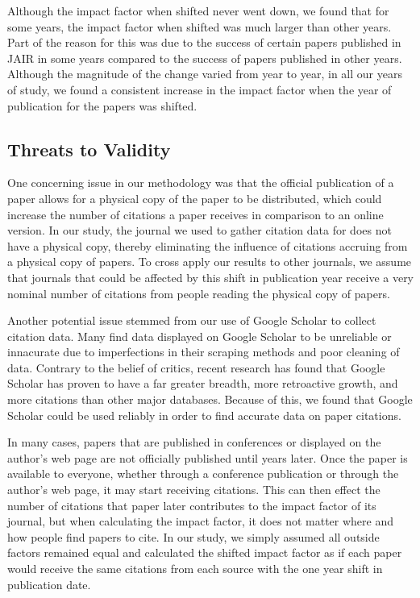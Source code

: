 \documentclass[times]{jtitauth}
\begin{document}
Although the impact factor when shifted never went down, we found that for some years, the impact factor when shifted was much larger than other years. Part of the reason for this was due to the success of certain papers published in JAIR in some years compared to the success of papers published in other years. Although the magnitude of the change varied from year to year, in all our years of study, we found a consistent increase in the impact factor when the year of publication for the papers was shifted.

\subsection{Threats to Validity}
One concerning issue in our methodology was that the official publication of a paper allows for a physical copy of the paper to be distributed, which could increase the number of citations a paper receives in comparison to an online version. In our study, the journal we used to gather citation data for does not have a physical copy, thereby eliminating the influence of citations accruing from a physical copy of papers. To cross apply our results to other journals, we assume that journals that could be affected by this shift in publication year receive a very nominal number of citations from people reading the physical copy of papers.   

Another potential issue stemmed from our use of Google Scholar to collect citation data. Many find data displayed on Google Scholar to be unreliable or innacurate due to imperfections in their scraping methods and poor cleaning of data. Contrary to the belief of critics, recent research has found that Google Scholar has proven to have a far greater breadth, more retroactive growth, and more citations than other major databases. Because of this, we found that Google Scholar could be used reliably in order to find accurate data on paper citations. 



In many cases, papers that are published in conferences or displayed on the author's web page are not officially published until years later. Once the paper is available to everyone, whether through a conference publication or through the author's web page, it may start receiving citations. This can then effect the number of citations that paper later contributes to the impact factor of its journal, but when calculating the impact factor, it does not matter where and how people find papers to cite. In our study, we simply assumed all outside factors remained equal and calculated the shifted impact factor as if each paper would receive the same citations from each source with the one year shift in publication date. 
\end{document}
